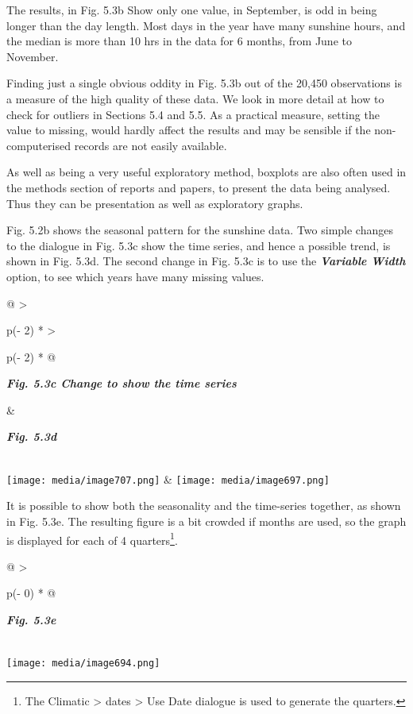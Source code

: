 \documentclass[
  letterpaper,
  DIV=11,
  numbers=noendperiod]{scrreprt}
\begin{document}
The results, in Fig. 5.3b Show only one value, in September, is odd in
being longer than the day length. Most days in the year have many
sunshine hours, and the median is more than 10 hrs in the data for 6
months, from June to November.

Finding just a single obvious oddity in Fig. 5.3b out of the 20,450
observations is a measure of the high quality of these data. We look in
more detail at how to check for outliers in Sections 5.4 and 5.5. As a
practical measure, setting the value to missing, would hardly affect the
results and may be sensible if the non-computerised records are not
easily available.

As well as being a very useful exploratory method, boxplots are also
often used in the methods section of reports and papers, to present the
data being analysed. Thus they can be presentation as well as
exploratory graphs.

Fig. 5.2b shows the seasonal pattern for the sunshine data. Two simple
changes to the dialogue in Fig. 5.3c show the time series, and hence a
possible trend, is shown in Fig. 5.3d. The second change in Fig. 5.3c is
to use the \textbf{\emph{Variable Width}} option, to see which years
have many missing values.

\begin{longtable}[]{@{}
  >{\raggedright\arraybackslash}p{(\columnwidth - 2\tabcolsep) * }
  >{\raggedright\arraybackslash}p{(\columnwidth - 2\tabcolsep) * }@{}}
\toprule\noalign{}
\begin{minipage}[b]{\linewidth}\raggedright
\textbf{\emph{Fig. 5.3c Change to show the time series}}
\end{minipage} & \begin{minipage}[b]{\linewidth}\raggedright
\textbf{\emph{Fig. 5.3d}}
\end{minipage} \\
\midrule\noalign{}
\endhead
\bottomrule\noalign{}
\endlastfoot
\texttt{[image: media/image707.png]} &
\texttt{[image: media/image697.png]} \\
\end{longtable}

It is possible to show both the seasonality and the time-series
together, as shown in Fig. 5.3e. The resulting figure is a bit crowded
if months are used, so the graph is displayed for each of 4
quarters\footnote{The Climatic \textgreater{} dates \textgreater{} Use
  Date dialogue is used to generate the quarters.}.

\begin{longtable}[]{@{}
  >{\raggedright\arraybackslash}p{(\columnwidth - 0\tabcolsep) * }@{}}
\toprule\noalign{}
\begin{minipage}[b]{\linewidth}\raggedright
\textbf{\emph{Fig. 5.3e}}
\end{minipage} \\
\midrule\noalign{}
\endhead
\bottomrule\noalign{}
\endlastfoot
\texttt{[image: media/image694.png]} \\
\end{longtable}
\end{document}

